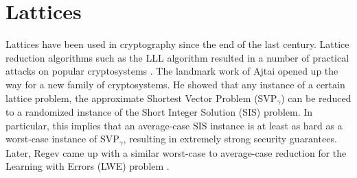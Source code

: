 \section{Lattices}
Lattices have been used in cryptography since the end of the last century. Lattice reduction algorithms such as the LLL algorithm resulted in a number of practical attacks on popular cryptosystems \cite{NV10}. The landmark work of Ajtai \cite{Ajt96} opened up the way for a new family of cryptosystems. He showed that any instance of a certain lattice problem, the approximate Shortest Vector Problem (SVP$_\gamma$) can be reduced to a randomized instance of the Short Integer Solution (SIS) problem. In particular, this implies that an average-case SIS instance is at least as hard as a worst-case instance of SVP$_\gamma$, resulting in extremely strong security guarantees. Later, Regev came up with a similar worst-case to average-case reduction for the Learning with Errors (LWE) problem \cite{Reg05}.







